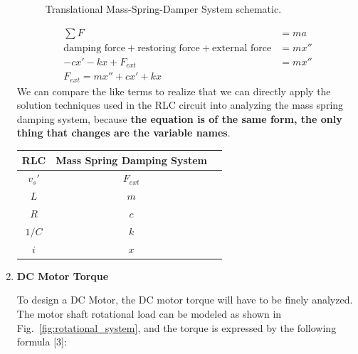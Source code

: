 \begin{enumerate}
\begin{figure}[H]
        \caption{Translational Mass-Spring-Damper System schematic.}
        \label{fig:translational_system}
    \end{figure}
    \begin{align*}
        \sum F &= ma\\
        \text{damping force} + \text{restoring force} + \text{external force} &= mx''\\
        -cx' - kx + F_{ext} &= mx''\\
        \boxed{F_{ext} = mx'' + cx' + kx}
    \end{align*}
    We can compare the like terms to realize that we can directly apply the solution techniques used in the RLC circuit into analyzing the mass spring damping system, because \textbf{the equation is of the same form, the only thing that changes are the variable names}.

    \begin{tabular}{|c|c|c|}
        \hline
        RLC & Mass Spring Damping System \\
        \hline
        $v_s'$ & $F_{ext}$ \\
        \hline
        $L$ & $m$ \\
        \hline
        $R$ & $c$ \\
        \hline
        $1/C$ & $k$ \\
        \hline
        $i$ & $x$ \\
        \hline
    \end{tabular}

    \item \textbf{DC Motor Torque}
    
    To design a DC Motor, the DC motor torque will have to be finely analyzed. The motor shaft rotational load can be modeled as shown in Fig.~\ref{fig:rotational_system}, and the torque is expressed by the following formula [3]:
    \begin{figure}[H]
        \centering
\end{figure}
\end{enumerate}
